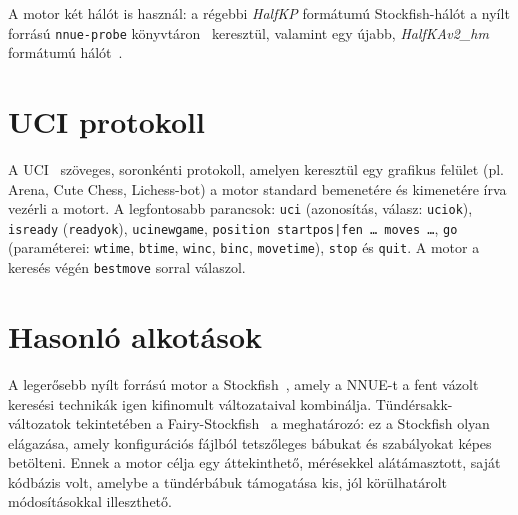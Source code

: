 A motor két hálót is használ: a régebbi \emph{HalfKP} formátumú Stockfish-hálót a nyílt forrású \texttt{nnue-probe} könyvtáron~\cite{NnueProbe} keresztül, valamint egy újabb, \emph{HalfKAv2\_hm} formátumú hálót~\cite{NnuePytorch}.

\section{UCI protokoll}

A UCI~\cite{UCI} szöveges, soronkénti protokoll, amelyen keresztül egy grafikus felület (pl. Arena, Cute Chess, Lichess-bot) a motor standard bemenetére és kimenetére írva vezérli a motort. A legfontosabb parancsok: \texttt{uci} (azonosítás, válasz: \texttt{uciok}), \texttt{isready} (\texttt{readyok}), \texttt{ucinewgame}, \texttt{position startpos|fen \ldots{} moves \ldots}, \texttt{go} (paraméterei: \texttt{wtime}, \texttt{btime}, \texttt{winc}, \texttt{binc}, \texttt{movetime}), \texttt{stop} és \texttt{quit}. A motor a keresés végén \texttt{bestmove} sorral válaszol.

\section{Hasonló alkotások}

A legerősebb nyílt forrású motor a Stockfish~\cite{Stockfish}, amely a NNUE-t a fent vázolt keresési technikák igen kifinomult változataival kombinálja. Tündérsakk-változatok tekintetében a Fairy-Stockfish~\cite{FairyStockfish} a meghatározó: ez a Stockfish olyan elágazása, amely konfigurációs fájlból tetszőleges bábukat és szabályokat képes betölteni. Ennek a motor célja egy áttekinthető, mérésekkel alátámasztott, saját kódbázis volt, amelybe a tündérbábuk támogatása kis, jól körülhatárolt módosításokkal illeszthető.
